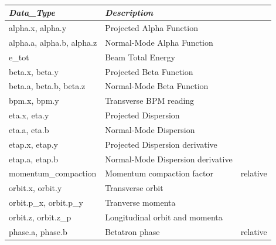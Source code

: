 \begin{table}[ht] 
\centering 
{\tt\small
\begin{tabular}{|l|l|l|} \hline
  {\it Data\_Type}              & {\it Description}                  &          \\ \hline 
    alpha.x, alpha.y            & Projected Alpha Function           &          \\ \hline 
    alpha.a, alpha.b, alpha.z   & Normal-Mode Alpha Function         &          \\ \hline 
    e\_tot                      & Beam Total Energy                  &          \\ \hline
    beta.x, beta.y              & Projected Beta Function            &          \\ \hline 
    beta.a, beta.b, beta.z      & Normal-Mode Beta Function          &          \\ \hline 
    bpm.x, bpm.y                & Transverse BPM reading             &          \\ \hline 
    eta.x, eta.y                & Projected Dispersion               &          \\ \hline 
    eta.a, eta.b                & Normal-Mode Dispersion             &          \\ \hline 
    etap.x, etap.y              & Projected Dispersion derivative    &          \\ \hline 
    etap.a, etap.b              & Normal-Mode Dispersion derivative  &          \\ \hline 
    momentum\_compaction        & Momentum compaction factor         & relative \\ \hline
    orbit.x, orbit.y            & Transverse orbit                   &          \\ \hline 
    orbit.p\_x, orbit.p\_y      & Tranverse momenta                  &          \\ \hline 
    orbit.z, orbit.z\_p         & Longitudinal orbit and momenta     &          \\ \hline 
    phase.a, phase.b            & Betatron phase                     & relative \\ \hline 

\end{tabular}}
\end{table}
